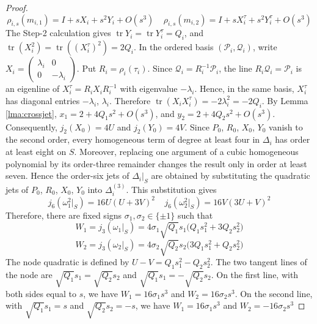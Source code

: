 \documentclass{article}
\DeclareMathOperator{\tr}{tr}
\theoremstyle{plain}
\theoremstyle{definition}
\theoremstyle{plain}
\theoremstyle{plain}
\theoremstyle{plain}
\theoremstyle{remark}
\theoremstyle{remark}
\theoremstyle{plain}
\theoremstyle{plain}
\newcounter{main}
\theoremstyle{plain}
\theoremstyle{plain}
\begin{document}
\begin{proof}
\begin{equation*}
	\rho_{i, s}(m_{i, 1}) = I + sX_i + s^2Y_i + O(s^3) \ \ \ \ \ \rho_{i, s}(m_{i, 2}) = I + sX_i^\tau + s^2Y_i^\tau + O(s^3)
\end{equation*}
The Step-2 calculation gives $\tr Y_i = \tr Y_i^\tau = Q_i$, and $\tr(X_i^2) = \tr((X_i^\tau)^2) = 2Q_i$. In the ordered basis $(\mathcal P_i, \mathcal Q_i)$, write $X_i = \left(\begin{smallmatrix}\lambda_i&0\\0&-\lambda_i\end{smallmatrix}\right)$. Put $R_i = \rho_i(\tau_i)$. Since $\mathcal Q_i = R_i^{-1}\mathcal P_i$, the line $R_i\mathcal Q_i = \mathcal P_i$ is an eigenline of $X_i^\tau = R_iX_iR_i^{-1}$ with eigenvalue $-\lambda_i$. Hence, in the same basis, $X_i^\tau$ has diagonal entries $-\lambda_i$, $\lambda_i$. Therefore $\tr(X_iX_i^\tau) = -2\lambda_i^2 = -2Q_i$. By Lemma \ref{lma:crossjet}, $x_1 = 2 + 4Q_1s^2 + O(s^3)$, and $y_2 = 2 + 4Q_2s^2 + O(s^3)$. Consequently, $j_2(X_0) = 4U$ and $j_2(Y_0) = 4V$. Since $P_0$, $R_0$, $X_0$, $Y_0$ vanish to the second order, every homogeneous term of degree at least four in $\Delta_i$ has order at least eight on $S$. Moreover, replacing one argument of a cubic homogeneous polynomial by its order-three remainder changes the result only in order at least seven. Hence the order-six jets of $\Delta_i|_S$ are obtained by substituting the quadratic jets of $P_0$, $R_0$, $X_0$, $Y_0$ into $\Delta_i^{(3)}$. This substitution gives
\begin{equation*}
	j_6(\omega_1^2|_S) = 16U(U + 3V)^2 \ \ \ \ \ j_6(\omega_2^2|_S) = 16V(3U+V)^2
\end{equation*}
Therefore, there are fixed signs $\sigma_1, \sigma_2 \in \{\pm 1\}$ such that
\begin{equation*}
	W_1 = j_3(\omega_1|_S) = 4\sigma_1 \sqrt{Q_1}s_1\bigl(Q_1s_1^2 + 3Q_2s_2^2\bigr)
\end{equation*}
\begin{equation*}
	W_2 = j_3(\omega_2|_S) = 4\sigma_2 \sqrt{Q_2}s_2\bigl(3Q_1s_1^2 + Q_2s_2^2\bigr)
\end{equation*}
The node quadratic is defined by $U - V = Q_1s_1^2 - Q_2s_2^2$. The two tangent lines of the node are $\sqrt{Q_1}s_1 = \sqrt{Q_2}s_2$ and $\sqrt{Q_1}s_1 = -\sqrt{Q_2}s_2$. On the first line, with both sides equal to $s$, we have $W_1 = 16\sigma_1s^3$ and $W_2 = 16\sigma_2s^3$. On the second line, with $\sqrt{Q_1}s_1 = s$ and $\sqrt{Q_2}s_2 = -s$, we have $W_1 = 16\sigma_1s^3$ and $W_2 = -16\sigma_2s^3$


\end{proof}
\end{document}

